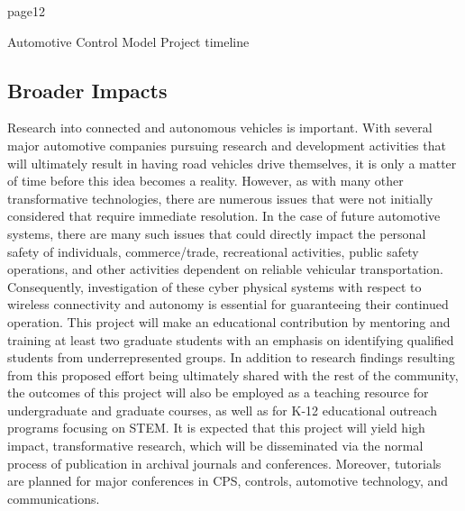 page12

Automotive Control Model 
Project timeline


\subsection{Broader Impacts}
Research into connected and autonomous vehicles is important.  With several major automotive 
companies pursuing research and development activities that will ultimately result in having 
road vehicles drive themselves, it is only a matter of time before this idea becomes a 
reality.  However, as with many other transformative technologies, there are numerous issues 
that were not initially considered that require immediate resolution.  In the case of future 
automotive systems, there are many such issues that could directly impact the personal safety 
of individuals, commerce/trade, recreational activities, public safety operations, and other 
activities dependent on reliable vehicular transportation.  Consequently, investigation of 
these cyber physical systems with respect to wireless connectivity and autonomy is essential 
for guaranteeing their continued operation. This project will make an educational 
contribution by mentoring and training at least two graduate students with an emphasis on 
identifying qualified students from underrepresented groups.  In addition to research 
findings resulting from this proposed effort being ultimately shared with the rest of the 
community, the outcomes of this project will also be employed as a teaching resource for 
undergraduate and graduate courses, as well as for K-12 educational outreach programs 
focusing on STEM. It is expected that this project will yield high impact, transformative 
research, which will be disseminated via the normal process of publication in archival 
journals and conferences.  Moreover, tutorials are planned for major conferences in CPS, 
controls, automotive technology, and communications.

